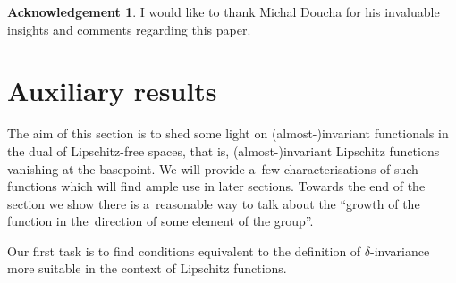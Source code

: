\documentclass[11pt,a4paper]{amsart}
\theoremstyle{definition}
\newtheorem*{acknowledgement}{Acknowledgement}
\begin{document}
	
	\begin{acknowledgement}
		I would like to thank Michal Doucha for his invaluable insights and comments regarding this paper.
	\end{acknowledgement}
	
	
	\section{Auxiliary results} \label{section:Aux}
	
	The aim of this section is to shed some light on (almost-)invariant functionals in the dual of Lipschitz-free spaces, that is, (almost-)invariant Lipschitz functions vanishing at the basepoint. We will provide a~few characterisations of such functions which will find ample use in later sections. Towards the end of the section we show there is a~reasonable way to talk about the ``growth of the function in the~direction of some element of the group''.
	
	Our first task is to find conditions equivalent to the definition of $\delta$-invariance more suitable in the context of Lipschitz functions.
	
\end{document}
